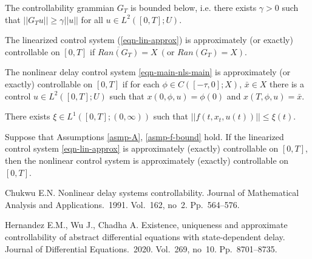 \documentclass[12pt]{llncs}
\begin{document}
\begin{asmp}\label{asmp-cg-inv}
The controllability grammian $G_T$ is bounded below, i.e. there exists $\gamma > 0$ such that $||G_T u|| \ge \gamma ||u||$ for all $u \in L^2([0,T];U)$.
\end{asmp}

\begin{definition}
The linearized control system (\ref{eqn-lin-approx}) is approximately (or exactly) controllable on $[0,T]$ if $\overline{Ran(G_T)} = X~ (\text{or } Ran(G_T) = X)$.
\end{definition}

\begin{definition}
The nonlinear delay control system \eqref{eqn-main-nls-main} is approximately (or exactly) controllable on $[0,T]$ if for each $\phi \in C([-\tau,0];X)$, $\bar{x} \in X$ there is a control $u \in L^2([0,T];U)$ such that $x(0,\phi,u) = \phi(0)$ and $x(T,\phi,u) = \bar{x}$.
\end{definition}

\begin{asmp}\label{asmp-f-bound}
There exists $\xi \in L^1([0,T];(0,\infty))$ such that $||f(t,x_t,u(t))|| \le \xi(t)$.
\end{asmp}

\begin{theorem}
Suppose that Assumptions \ref{asmp-A}, \ref{asmp-f-bound} hold. If the linearized control system \eqref{eqn-lin-approx} is approximately (exactly) controllable on $[0,T]$, then the nonlinear control system is approximately (exactly) controllable on $[0,T]$.
\end{theorem}



\begin{thebibliography}{9} %

%

Chukwu E.N. Nonlinear delay systems controllability. Journal of Mathematical Analysis and Applications.~1991. Vol.~162, no~2. Pp.~564--576.

Hernandez E.M., Wu J., Chadha A. Existence, uniqueness and approximate controllability of abstract differential equations with state-dependent delay. Journal of Differential Equations.~2020. Vol.~269, no~10. Pp.~8701--8735.

\end{thebibliography}


%
%
%


\end{document}
